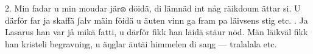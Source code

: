 \setlength{\columnsep}{0.2cm}
\begin{multicols}{2}
2.  Min fadar u min moudar järɷ döidä,
    di lämnäd int någ räikdoum ättar si.
    U därför far ja skaffä ʃalv mäin föidä
    u äuten vinn ga fram pa läivsens stig etc.
\vfill{}.  Ja Lasarus han var jå mikä fatti,
    u därför fikk han läidä stäur nöd.
    Män läikväl fikk han kristeli begravniŋg,
    u äŋglar äutäi himmelen di saŋg — tralalala etc.
\end{multicols}
